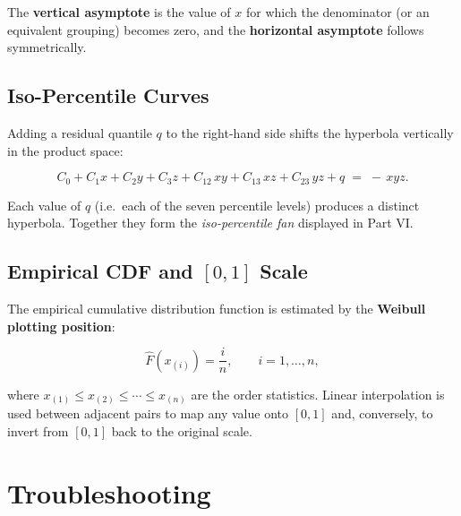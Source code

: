 \documentclass[12pt,a4paper]{article}
\begin{document}
The \textbf{vertical asymptote} is the value of $x$ for which the denominator
(or an equivalent grouping) becomes zero, and the \textbf{horizontal asymptote}
follows symmetrically.

\subsection{Iso-Percentile Curves}

Adding a residual quantile $q$ to the right-hand side shifts the hyperbola
vertically in the product space:

\[
    C_0 + C_1 x + C_2 y + C_3 z + C_{12}\,xy + C_{13}\,xz + C_{23}\,yz + q
    \;=\; -\,xyz.
\]

Each value of $q$ (i.e.\ each of the seven percentile levels) produces a distinct
hyperbola.  Together they form the \emph{iso-percentile fan} displayed in Part VI.

\subsection{Empirical CDF and \texorpdfstring{$[0,1]$}{[0,1]} Scale}

The empirical cumulative distribution function is estimated by the \textbf{Weibull
plotting position}:

\[
    \hat{F}(x_{(i)}) = \frac{i}{n}, \qquad i = 1, \dots, n,
\]

where $x_{(1)} \le x_{(2)} \le \cdots \le x_{(n)}$ are the order statistics.
Linear interpolation is used between adjacent pairs to map any value onto
$[0,1]$ and, conversely, to invert from $[0,1]$ back to the original scale.

\section{Troubleshooting}
\end{document}
